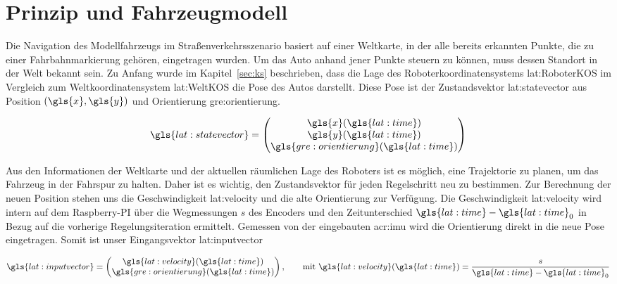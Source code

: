 \section{Prinzip und Fahrzeugmodell \dcfirstauthorshort}
\label{sec:regelung:prinzip}

Die Navigation des Modellfahrzeugs im Straßenverkehrsszenario basiert auf einer Weltkarte, in der alle bereits erkannten Punkte, die zu einer Fahrbahnmarkierung gehören, eingetragen wurden. Um das Auto anhand jener Punkte steuern zu können, muss dessen Standort in der Welt bekannt sein. Zu Anfang wurde im Kapitel~\ref{sec:ks} beschrieben, dass die Lage des Roboterkoordinatensystems \gls{lat:RoboterKOS} im Vergleich zum Weltkoordinatensystem \gls{lat:WeltKOS} die Pose des Autos darstellt. Diese Pose ist der Zustandsvektor \gls{lat:statevector} aus Position \( (\gls{x},\gls{y}) \) und Orientierung \gls{gre:orientierung}.

\begin{equation}
\gls{lat:statevector} = 
\begin{pmatrix}
\gls{x}(\gls{lat:time}) 	\\
\gls{y}(\gls{lat:time})	\\
\gls{gre:orientierung}(\gls{lat:time})    	\\
\end{pmatrix}
\label{eq:regelung_prinzip_pose}
\end{equation} 

 Aus den Informationen der Weltkarte und der aktuellen räumlichen Lage des Roboters ist es möglich, eine Trajektorie zu planen, um das Fahrzeug in der Fahrspur zu halten. Daher ist es wichtig, den Zustandsvektor für jeden Regelschritt neu zu bestimmen. Zur Berechnung der neuen Position stehen uns die Geschwindigkeit \gls{lat:velocity} und die alte Orientierung zur Verfügung. Die Geschwindigkeit \gls{lat:velocity} wird intern auf dem Raspberry-PI über die Wegmessungen \(s\) des Encoders und den Zeitunterschied \(\gls{lat:time}-{\gls{lat:time}}_0\) in Bezug auf die vorherige Regelungsiteration ermittelt. Gemessen von der eingebauten \gls{acr:imu} wird die Orientierung direkt in die neue Pose eingetragen. Somit ist unser Eingangsvektor \gls{lat:inputvector}
 
\begin{equation}
\gls{lat:inputvector} = 
\begin{pmatrix}
\gls{lat:velocity}(\gls{lat:time}) 			\\
\gls{gre:orientierung}(\gls{lat:time})    	\\
\end{pmatrix}
, \qquad \text{mit }
\gls{lat:velocity}(\gls{lat:time}) = \frac{s}{\gls{lat:time}-{\gls{lat:time}}_0}
\end{equation} 
 
